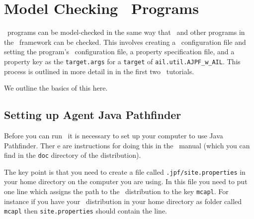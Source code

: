 \documentclass[a4]{article}
\begin{document}
\section{Model Checking \goal\ Programs}

\goal\ programs can be model-checked in the same way that \gwendolen\ and other programs in the \ail\ framework can be checked.  This involves creating a \jpf\ configuration file and setting the program's \ail\ configuration file, a property specification file, and a property key as the \texttt{target.args} for a \texttt{target} of \texttt{ail.util.AJPF\_w\_AIL}.  This process is outlined in more detail in in the first two \ajpf\ tutorials.

We outline the basics of this here.

\subsection{Setting up Agent Java Pathfinder}
Before you can run \ajpf\ it is necessary to set up your computer to use Java Pathfinder.  Ther
e are instructions for doing this in the \mcapl\ manual (which you can find in the \texttt{doc}
 directory of the distribution).

The key point is that you need to create a file called \texttt{.jpf/site.properties} in your home directory on the computer you are using.  In this file you need to put one line which assigns the path to the \mcapl\ distribution to the key \texttt{mcapl}.  For instance if you have your \mcapl\ distribution in your home directory as  folder called \texttt{mcapl} then \texttt{site.properties} should contain the line.
\end{document}
